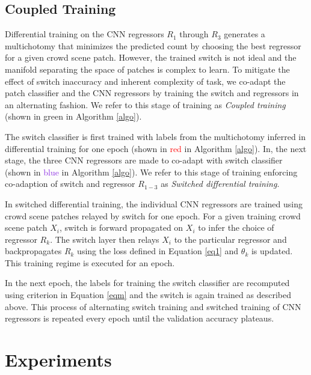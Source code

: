 \documentclass[10pt,twocolumn,letterpaper]{article}
\begin{document}
\subsection{Coupled Training}
\label{a4}
Differential training on the CNN regressors $R_1$ through $R_3$ generates a multichotomy that minimizes the predicted count by choosing the best regressor for a given crowd scene patch. However, the trained switch is not ideal and the manifold separating the space of patches is complex to learn. To mitigate the effect of switch inaccuracy and inherent complexity of task, we co-adapt the patch classifier and the CNN regressors by training the switch and regressors in an alternating fashion. We refer to this stage of training as \emph{Coupled training} (shown in \textcolor{OliveGreen}{green} in Algorithm \ref{algo}). 

The switch classifier is first trained
with labels from the multichotomy inferred in differential training for one epoch (shown in \textcolor{red}{red} in Algorithm \ref{algo}). In, the next stage, the three CNN regressors are made to co-adapt with switch classifier (shown in \textcolor{BlueViolet}{blue} in Algorithm \ref{algo}). We refer to this stage of training enforcing co-adaption of switch and regressor $R_{1-3}$ as \emph{Switched differential training}.

In switched differential training, the individual CNN regressors are trained using crowd scene patches relayed by switch for one epoch. For a given training crowd scene patch $X_i$, switch is forward propagated on $X_i$ to infer the choice of regressor $R_k$. The switch layer then relays $X_i$ to the particular regressor and backpropagates $R_k$ using the loss defined in Equation \ref{eq1} and $\theta_k$ is updated. This training regime is executed for an epoch. 

In the next epoch, the labels for training the switch classifier are recomputed using criterion in Equation \ref{eqm} and the switch is again trained as described above. This process of alternating switch training and switched training of CNN regressors is repeated every epoch until the validation accuracy plateaus. 







\section{Experiments}
\end{document}
